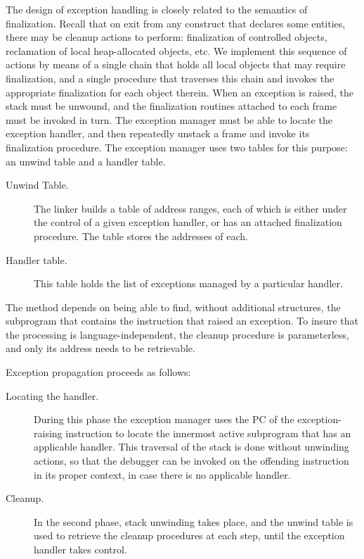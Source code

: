 The design of exception handling is closely related to the semantics of
finalization. Recall that on exit from any construct that declares some
entities, there may be cleanup actions to perform: finalization of
controlled objects, reclamation of local heap-allocated objects, 
etc. We implement this sequence of actions by means
of a single chain that holds all local objects that may require finalization,
and a single procedure that traverses this chain and invokes the appropriate
finalization for each object therein. When an exception is raised, the stack
must be unwound,  and the finalization routines attached to each frame must
be invoked in turn. The exception manager must be able to locate the
exception handler, and then repeatedly unstack a frame and invoke its 
finalization procedure. The exception manager uses two tables for this
purpose: an unwind table and a handler table.   
 
\begin{description}

\item[Unwind Table.] The linker builds a table of address ranges, each of which
is either under the control of a given exception handler, or has an attached
finalization procedure. The table stores the addresses of each. 

\item[Handler table.] This table holds the list of exceptions managed by
a particular handler. 

\end{description}

The method depends on being able to find, without additional structures, the
subprogram that contains the instruction that raised an exception. To insure
that the processing is language-independent, the cleanup procedure is
parameterless, and only its address needs to be retrievable.

Exception propagation proceeds as follows:

\begin{description}

\item[Locating the handler.] During this phase the exception manager uses the
PC of the exception-raising instruction to locate the innermost active 
subprogram that has an applicable handler. This traversal of the stack is
done without unwinding actions, so that the debugger can be invoked on  the
offending instruction in its proper context, in case there is no
applicable handler. 

\item[Cleanup.] In the second phase, stack unwinding takes place,  and the
unwind table is used to retrieve the cleanup procedures at each step, until
the exception handler takes control. 

\end{description}


